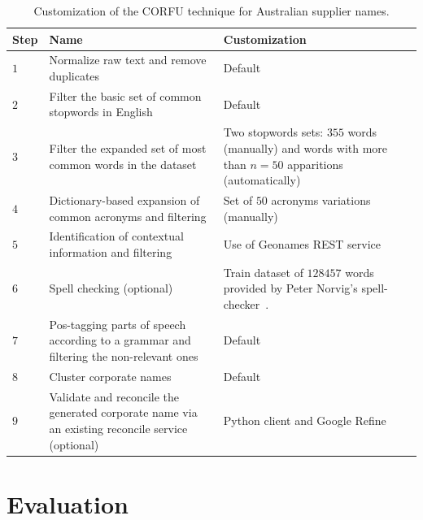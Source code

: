 \documentclass{llncs}
\begin{document}
\begin{table}[!htb]
\renewcommand{\arraystretch}{1.3}
\begin{center}
\begin{tabular}{|p{1cm}|p{5.5cm}|p{5.5cm}|}
\hline
  \textbf{Step} & \textbf{Name} & \textbf{Customization}  \\  \hline
  $1$ & Normalize raw text and remove duplicates & Default \\ \hline
  $2$ & Filter the basic set of common stopwords in English & Default\\ \hline
  $3$ & Filter the expanded set of most common words in the dataset & Two stopwords sets: $355$ words (manually) and words with more than $n=50 $ apparitions (automatically) \\ \hline
  $4$ & Dictionary-based expansion of common acronyms and filtering & Set of $50$ acronyms variations (manually) \\ \hline
  $5$ & Identification of contextual information and filtering & Use of Geonames REST service\\ \hline
  $6$ & Spell checking (optional) & Train dataset of $128457$ words provided by Peter Norvig's spell-checker~\cite{NorvigSpelling}. \\ \hline
  $7$ & Pos-tagging parts of speech according to a grammar and filtering the non-relevant ones & Default \\ \hline
  $8$ & Cluster corporate names & Default \\ \hline
  $9$ & Validate and reconcile the generated corporate name via an existing reconcile service (optional) & Python client and Google Refine \\ \hline
  \hline
  \end{tabular}
  \caption{Customization of the CORFU technique for Australian supplier names.}
  \label{config-corfu}
  \end{center}
\end{table} 


\section{Evaluation}
\end{document}
